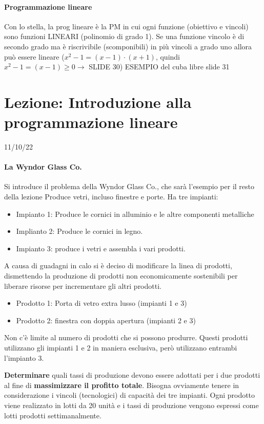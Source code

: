 \documentclass[12pt, a4paper, openany]{book}
\begin{document}
\paragraph*{Programmazione lineare} Con lo stella, la prog lineare è la PM in cui ogni funzione (obiettivo e vincoli) sono funzioni LINEARI (polinomio di grado 1).
Se una funzione vincolo è di secondo grado ma è riscrivibile (scomponibili) in più vincoli a grado uno allora può essere lineare ($x^2-1 =(x-1) \cdot (x+1)$, quindi $x^2-1 =(x-1) \geq 0 \to $ {SLIDE 30})
{ESEMPIO del cuba libre slide 31}

\section{Lezione: Introduzione alla programmazione lineare} 11/10/22
\paragraph*{La Wyndor Glass Co.} Si introduce il problema della Wyndor Glass Co., che sarà l'esempio per il resto della lezione
Produce vetri, incluso finestre e porte.
Ha tre impianti:
\begin{itemize}
    \item Impianto 1: Produce le cornici in alluminio e le altre componenti metalliche
    \item Implianto 2: Produce le cornici in legno.
    \item Impianto 3: produce i vetri e assembla i vari prodotti.
\end{itemize}
A causa di guadagni in calo si è deciso di modificare la linea di prodotti, dismettendo la produzione di prodotti non economicamente sostenibili per liberare risorse
per incrementare gli altri prodotti.
\begin{itemize}
    \item Prodotto 1: Porta di vetro extra lusso (impianti 1 e 3)
    \item Prodotto 2: finestra con doppia apertura (impianti 2 e 3)
\end{itemize}
Non c'è limite al numero di prodotti che si possono produrre.
Questi prodotti utilizzano gli impianti 1 e 2 in maniera esclusiva, però utilizzano entrambi l'impianto 3.

\textbf{Determinare} quali tassi di produzione devono essere adottati per i due prodotti al fine di \textbf{massimizzare il profitto totale}.
Bisogna ovviamente tenere in considerazione i vincoli (tecnologici) di capacità dei tre impianti.
Ogni prodotto viene realizzato in lotti da 20 unità e i tassi di produzione vengono espressi come lotti prodotti settimanalmente.
\end{document}
